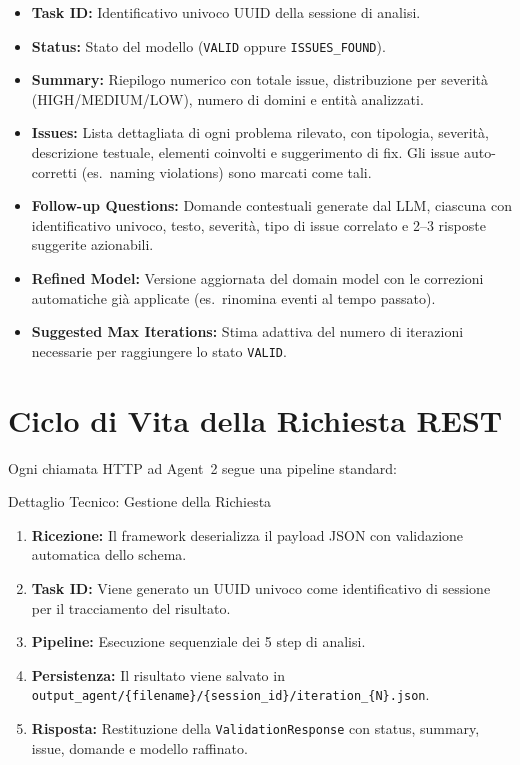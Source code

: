 \documentclass[12pt,a4paper]{report}
\begin{document}
\begin{itemize}
  \item \textbf{Task ID:} Identificativo univoco UUID della sessione di analisi.
  \item \textbf{Status:} Stato del modello (\texttt{VALID} oppure \texttt{ISSUES\_FOUND}).
  \item \textbf{Summary:} Riepilogo numerico con totale issue, distribuzione per severità
        (HIGH/MEDIUM/LOW), numero di domini e entità analizzati.
  \item \textbf{Issues:} Lista dettagliata di ogni problema rilevato, con tipologia,
        severità, descrizione testuale, elementi coinvolti e suggerimento di fix.
        Gli issue auto-corretti (es.\ naming violations) sono marcati come tali.
  \item \textbf{Follow-up Questions:} Domande contestuali generate dal LLM, ciascuna
        con identificativo univoco, testo, severità, tipo di issue correlato e
        2--3 risposte suggerite azionabili.
  \item \textbf{Refined Model:} Versione aggiornata del domain model con le correzioni
        automatiche già applicate (es.\ rinomina eventi al tempo passato).
  \item \textbf{Suggested Max Iterations:} Stima adattiva del numero di iterazioni
        necessarie per raggiungere lo stato \texttt{VALID}.
\end{itemize}

\section{Ciclo di Vita della Richiesta REST}

Ogni chiamata HTTP ad Agent~2 segue una pipeline standard:

\begin{technicalbox}{Dettaglio Tecnico: Gestione della Richiesta}
\begin{enumerate}
  \item \textbf{Ricezione:} Il framework deserializza il payload JSON
        con validazione automatica dello schema.
  \item \textbf{Task ID:} Viene generato un UUID univoco come identificativo
        di sessione per il tracciamento del risultato.
  \item \textbf{Pipeline:} Esecuzione sequenziale dei 5 step di analisi.
  \item \textbf{Persistenza:} Il risultato viene salvato in
        \texttt{output\_agent/\{filename\}/\{session\_id\}/iteration\_\{N\}.json}.
  \item \textbf{Risposta:} Restituzione della \texttt{ValidationResponse}
        con status, summary, issue, domande e modello raffinato.
\end{enumerate}
\end{technicalbox}
\end{document}
